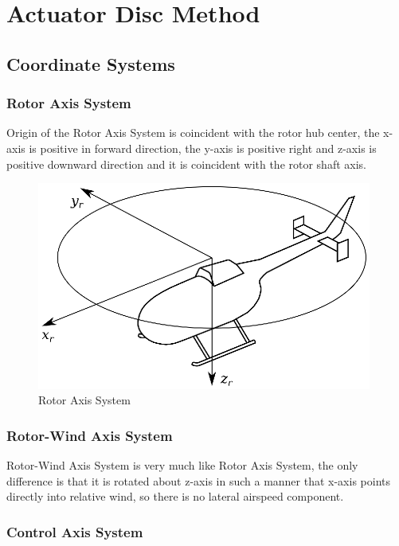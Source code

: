 \chapter{Actuator Disc Method}

\section{Coordinate Systems}

\subsection{Rotor Axis System}

Origin of the Rotor Axis System is coincident with the rotor hub center, the x-axis is positive in forward direction, the y-axis is positive right and z-axis is positive downward direction and it is coincident with the rotor shaft axis.

\begin{figure}[h!]
  \centering
  \includegraphics[width=110mm]{eps/coordinate_system_RAS.eps}
  \caption{Rotor Axis System}
\end{figure}

\subsection{Rotor-Wind Axis System}

Rotor-Wind Axis System is very much like Rotor Axis System, the only difference is that it is rotated about z-axis in such a manner that x-axis points directly into relative wind, so there is no lateral airspeed component.

\subsection{Control Axis System}

